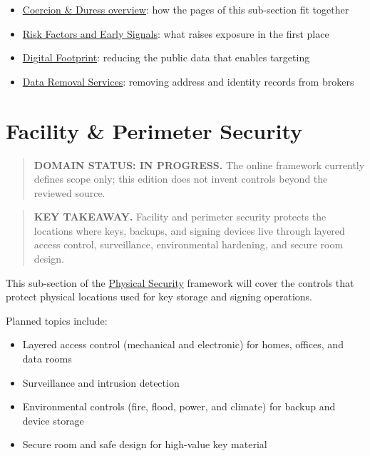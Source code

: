 \begin{itemize}
\tightlist
\item
  \href{https://frameworks.securityalliance.dev/physical-security/coercion-and-duress/overview}{Coercion \& Duress overview}: how the pages of this sub-section fit together
\item
  \href{https://frameworks.securityalliance.dev/physical-security/coercion-and-duress/risk-factors-and-early-signals}{Risk Factors and Early Signals}: what raises exposure in the first place
\item
  \href{https://frameworks.securityalliance.dev/privacy/digital-footprint}{Digital Footprint}: reducing the public data that enables targeting
\item
  \href{https://frameworks.securityalliance.dev/privacy/data-removal-services}{Data Removal Services}: removing address and identity records from brokers
\end{itemize}


\chapter{Facility \& Perimeter Security}\label{facility-perimeter-security}

\begin{quote}
\textbf{DOMAIN STATUS: IN PROGRESS.} The online framework currently defines scope only; this edition does not invent controls beyond the reviewed source.
\end{quote}

\begin{quote}
\textbf{KEY TAKEAWAY.} Facility and perimeter security protects the locations where keys, backups, and signing devices live through layered access control, surveillance, environmental hardening, and secure room design.
\end{quote}

This sub-section of the \href{https://frameworks.securityalliance.dev/physical-security/overview}{Physical Security} framework will cover the controls that protect physical locations used for key storage and signing operations.

Planned topics include:

\begin{itemize}
\tightlist
\item
  Layered access control (mechanical and electronic) for homes, offices, and data rooms
\item
  Surveillance and intrusion detection
\item
  Environmental controls (fire, flood, power, and climate) for backup and device storage
\item
  Secure room and safe design for high-value key material
\end{itemize}

